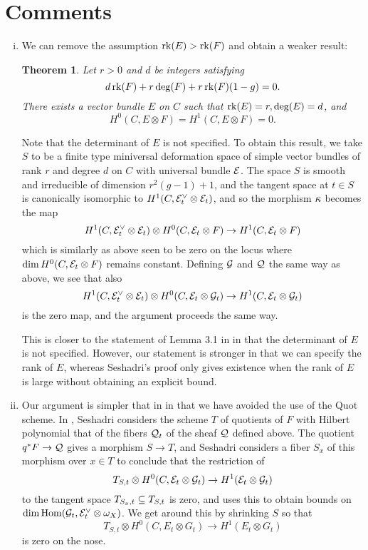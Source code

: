 \documentclass[letterpaper,12pt]{article}
\newtheorem{thm}{Theorem}[section]
\theoremstyle{remark}
\begin{document}
\section{Comments}
\begin{enumerate}[(i)]
    \item We can remove the assumption $\operatorname{\mathrm{rk}}(E) > \operatorname{\mathrm{rk}}(F)$ and obtain a weaker result: 
    \begin{thm}
        Let $r > 0$ and $d$ be integers satisfying
        \[ d \operatorname{\mathrm{rk}}(F) + r \deg(F) + r \operatorname{\mathrm{rk}}(F) (1-g) = 0. \]
        There exists a vector bundle $E$ on $C$ such that $\operatorname{\mathrm{rk}}(E) = r, \deg(E) = d$, and 
        \[ H^0(C, E \otimes F) = H^1(C, E \otimes F) = 0. \]
    \end{thm}
    Note that the determinant of $E$ is not specified. To obtain this result, we take $S$ to be a finite type miniversal deformation space of simple vector bundles of rank $r$ and degree $d$ on $C$ with universal bundle $\mathcal{E}$. The space $S$ is smooth and irreducible of dimension $r^2(g-1)+1$, and the tangent space at $t \in S$ is canonically isomorphic to $H^1(C, \mathcal{E}_t^\vee \otimes \mathcal{E}_t)$, and so the morphism $\kappa$ becomes the map
    \[ H^1(C, \mathcal{E}_t^\vee \otimes \mathcal{E}_t) \otimes H^0(C, \mathcal{E}_t \otimes F) \to H^1(C, \mathcal{E}_t \otimes F) \]
    which is similarly as above seen to be zero on the locus where $\dim H^0(C, \mathcal{E}_t \otimes F)$ remains constant. Defining $\mathcal{G}$ and $\mathcal{Q}$ the same way as above, we see that also
    \[ H^1(C, \mathcal{E}_t^\vee \otimes \mathcal{E}_t) \otimes H^0(C, \mathcal{E}_t \otimes \mathcal{G}_t) \to H^1(C, \mathcal{E}_t \otimes \mathcal{G}_t) \]
    is the zero map, and the argument proceeds the same way. 
    
    This is closer to the statement of Lemma 3.1 in \cite{seshadri} in that the determinant of $E$ is not specified. However, our statement is stronger in that we can specify the rank of $E$, whereas Seshadri's proof only gives existence when the rank of $E$ is large without obtaining an explicit bound.
 
    \item Our argument is simpler that in \cite{seshadri} in that we have avoided the use of the Quot scheme. In \cite{seshadri}, Seshadri considers the scheme $T$ of quotients of $F$ with Hilbert polynomial that of the fibers $\mathcal{Q}_t$ of the sheaf $\mathcal{Q}$ defined above. The quotient $q^*F \to \mathcal{Q}$ gives a morphism $S \to T$, and Seshadri considers a fiber $S_x$ of this morphism over $x \in T$ to conclude that the restriction of 
    \[ T_{S,t} \otimes H^0(C, \mathcal{E}_t \otimes \mathcal{G}_t) \to H^1(\mathcal{E}_t \otimes \mathcal{G}_t) \]
    to the tangent space $T_{S_x, t} \subseteq T_{S,t}$ is zero, and uses this to obtain bounds on $\dim \mathrm{Hom}(\mathcal{G}_t, \mathcal{E}_t^\vee \otimes \omega_X)$. We get around this by shrinking $S$ so that 
    \[ T_{S,t} \otimes H^0(C, E_t \otimes G_t) \to H^1(E_t \otimes G_t) \]
    is zero on the nose.
    

\end{enumerate}
\end{document}
